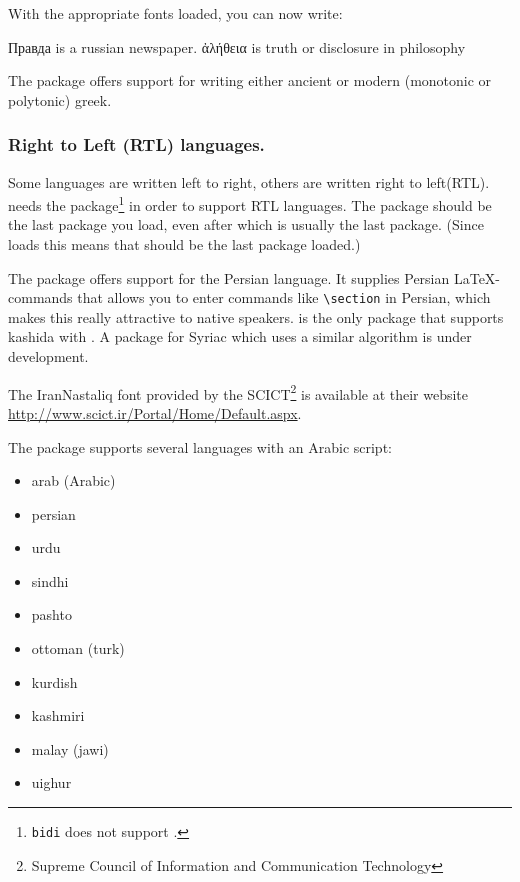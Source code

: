 With the appropriate fonts loaded, you can now write:

\begin{example}
\textrussian{Правда} is
a russian newspaper.
\textgreek{ἀλήθεια} is truth
or disclosure in philosophy
\end{example}

The package \cite{xgreek} offers support for
writing either ancient or modern (monotonic or polytonic) greek.

\subsubsection{Right to Left (RTL) languages.}

Some languages are written left to right, others are written right to
left(RTL).  needs the \cite{bidi}
package\footnote{\texttt{bidi} does not support .} in order
to support RTL languages. The  package should be the last package
you load, even after  which is usually the last package.
(Since  loads  this means that 
should be the last package loaded.)

The package \cite{xepersian} offers support
for the Persian language. It supplies Persian \LaTeX-commands that allows
you to enter commands like \verb|\section| in Persian, which makes this
really attractive to native speakers.  is the only package
that supports kashida with . A package for
Syriac which uses a similar algorithm is under development.

The IranNastaliq font provided by the SCICT\footnote{Supreme Council of
Information and Communication Technology} is available at their website
\url{http://www.scict.ir/Portal/Home/Default.aspx}.

The \cite{arabxetex} package supports several languages with
an Arabic script:

\begin{itemize}
\item arab (Arabic)
\item persian
\item urdu
\item sindhi
\item pashto
\item ottoman (turk)
\item kurdish
\item kashmiri
\item malay (jawi)
\item uighur
\end{itemize}

